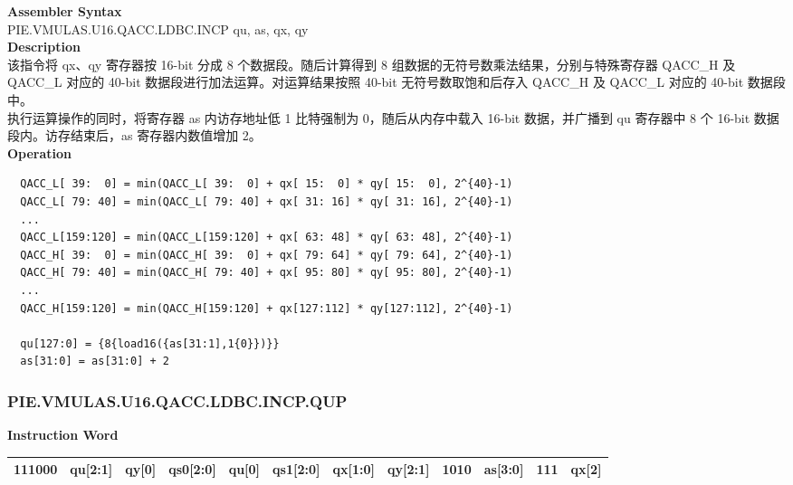 \textbf{Assembler Syntax} \\
PIE.VMULAS.U16.QACC.LDBC.INCP qu, as, qx, qy \\
\textbf{Description} \\
该指令将 qx、qy 寄存器按 16-bit 分成 8 个数据段。随后计算得到 8 组数据的无符号数乘法结果，分别与特殊寄存器 QACC\_H 及 QACC\_L 对应的 40-bit 数据段进行加法运算。对运算结果按照 40-bit 无符号数取饱和后存入 QACC\_H 及 QACC\_L 对应的 40-bit 数据段中。\\
执行运算操作的同时，将寄存器 as 内访存地址低 1 比特强制为 0，随后从内存中载入 16-bit 数据，并广播到 qu 寄存器中 8 个 16-bit 数据段内。访存结束后，as 寄存器内数值增加 2。\\
\textbf{Operation}
\begin{lstlisting}
  QACC_L[ 39:  0] = min(QACC_L[ 39:  0] + qx[ 15:  0] * qy[ 15:  0], 2^{40}-1)
  QACC_L[ 79: 40] = min(QACC_L[ 79: 40] + qx[ 31: 16] * qy[ 31: 16], 2^{40}-1)
  ...
  QACC_L[159:120] = min(QACC_L[159:120] + qx[ 63: 48] * qy[ 63: 48], 2^{40}-1)
  QACC_H[ 39:  0] = min(QACC_H[ 39:  0] + qx[ 79: 64] * qy[ 79: 64], 2^{40}-1)
  QACC_H[ 79: 40] = min(QACC_H[ 79: 40] + qx[ 95: 80] * qy[ 95: 80], 2^{40}-1)
  ...
  QACC_H[159:120] = min(QACC_H[159:120] + qx[127:112] * qy[127:112], 2^{40}-1)

  qu[127:0] = {8{load16({as[31:1],1{0}})}}
  as[31:0] = as[31:0] + 2
\end{lstlisting}

\newpage
\subsubsection{PIE.VMULAS.U16.QACC.LDBC.INCP.QUP}\label{instruction:PIEVMULASU16QACCLDBCINCPQUP}
\setlength\tabcolsep{6pt}
\textbf{Instruction Word} \\
\begin{tabular}{|c|c|c|c|c|c|c|c|c|c|c|c|}
	\hline
	111000 & qu[2:1] & qy[0] & qs0[2:0] & qu[0] & qs1[2:0] & qx[1:0] & qy[2:1] & 1010 & as[3:0] & 111 & qx[2] \\
	\hline
\end{tabular}


